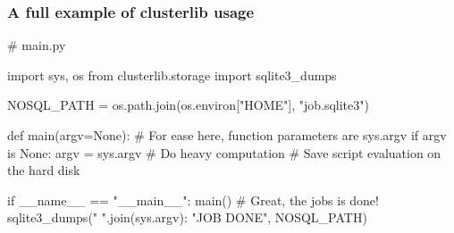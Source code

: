 \documentclass[11pt,compress,serif]{beamer}
\begin{document}
\frame[plain]
{
    \titlepage
}

%    
%    
%    

\begin{frame}[fragile=singleslide]
    \frametitle{A full example of clusterlib usage}
    

\begin{pythoncode}
# main.py

import sys, os
from clusterlib.storage import sqlite3_dumps

NOSQL_PATH = os.path.join(os.environ["HOME"], "job.sqlite3")

def main(argv=None):
    # For ease here, function parameters are sys.argv
    if argv is None: 
        argv = sys.argv  
    # Do heavy computation
    # Save script evaluation on the hard disk

if __name__ == "__main__":
    main()
    # Great, the jobs is done!
    sqlite3_dumps({" ".join(sys.argv): "JOB DONE"}, NOSQL_PATH)
\end{pythoncode}

\end{frame}
\end{document}
